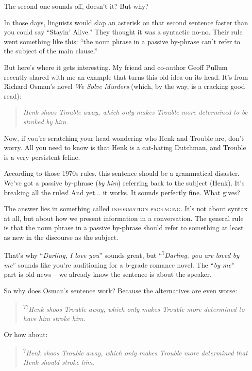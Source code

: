 The second one sounds off, doesn't it? But why? 

In those days, linguists would slap an asterisk on that second sentence faster than you could say \enquote{Stayin' Alive.} They thought it was a syntactic no-no. Their rule went something like this: \enquote{the noun phrase in a passive by-phrase can't refer to the subject of the main clause.}

But here's where it gets interesting. My friend and co-author Geoff Pullum recently shared with me an example that turns this old idea on its head. It's from Richard Osman's novel \textit{We Solve Murders} (which, by the way, is a cracking good read):

\begin{quote}
\textit{Henk shoos Trouble away, which only makes Trouble more determined to be stroked by him.}
\end{quote}

Now, if you're scratching your head wondering who Henk and Trouble are, don't worry. All you need to know is that Henk is a cat-hating Dutchman, and Trouble is a very persistent feline.

According to those 1970s rules, this sentence should be a grammatical disaster. We've got a passive by-phrase (\textit{by him}) referring back to the subject (Henk). It's breaking all the rules! And yet... it works. It sounds perfectly fine. What gives?

The answer lies in something called \textsc{information packaging}. It's not about syntax at all, but about how we present information in a conversation. The general rule is that the noun phrase in a passive by-phrase should refer to something at least as new in the discourse as the subject.

That's why \enquote{\textit{Darling, I love you}} sounds great, but \enquote{\textsuperscript{?}\textit{Darling, you are loved by me}} sounds like you're auditioning for a b-grade romance novel. The \enquote{\textit{by me}} part is old news -- we already know the sentence is about the speaker.

So why does Osman's sentence work? Because the alternatives are even worse:

\begin{quote}
\textsuperscript{??}\textit{Henk shoos Trouble away, which only makes Trouble more determined to have him stroke him.}
\end{quote}

Or how about:

\begin{quote}
\textsuperscript{?}\textit{Henk shoos Trouble away, which only makes Trouble more determined that Henk should stroke him.}
\end{quote}


